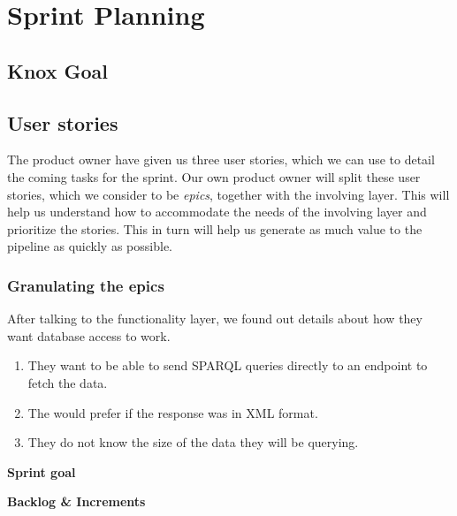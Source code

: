 \section{Sprint Planning}
\subsection{Knox Goal}
\subsection{User stories}
The \knox{} product owner have given us three user stories, which we can use to detail the coming tasks for the sprint.
Our own product owner will split these user stories, which we consider to be \textit{epics}, together with the involving layer. 
This will help us understand how to accommodate the needs of the involving layer and prioritize the stories. 
This in turn will help us generate as much value to the pipeline as quickly as possible.


\subsubsection*{Granulating the epics}
After talking to the functionality layer, we found out details about how they want database access to work. 
\begin{enumerate}
    \item They want to be able to send SPARQL queries directly to an endpoint to fetch the data.
    \item The would prefer if the response was in XML format. 
    \item They do not know the size of the data they will be querying.
\end{enumerate}




\textbf{Sprint goal}


\textbf{Backlog \& Increments}

